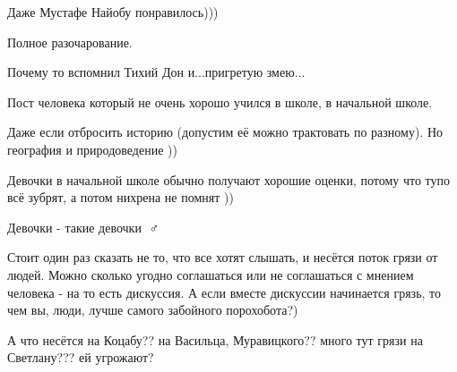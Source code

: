 \begin{itemize}
Даже Мустафе Найобу понравилось)))

 
Полное разочарование.

 
Почему то вспомнил Тихий Дон и...пригретую змею...

 

Пост человека который не очень хорошо учился в школе, в начальной школе.

Даже если отбросить историю (допустим её можно трактовать по разному). Но география и природоведение ))

Девочки в начальной школе обычно получают хорошие оценки, потому что тупо всё зубрят, а потом нихрена не помнят ))

Девочки - такие девочки 🤷♂️ \Laughey[1.0][white]

 

Стоит один раз сказать не то, что все хотят слышать, и несётся поток грязи от
людей. Можно сколько угодно соглашаться или не соглашаться с мнением человека -
на то есть дискуссия. А если вместе дискуссии начинается грязь, то чем вы,
люди, лучше самого забойного порохобота?)

\begin{itemize}
 
А что несётся на Коцабу?? на Васильца, Муравицкого?? много тут грязи на Светлану??? ей угрожают?
\end{itemize}


\end{itemize}
